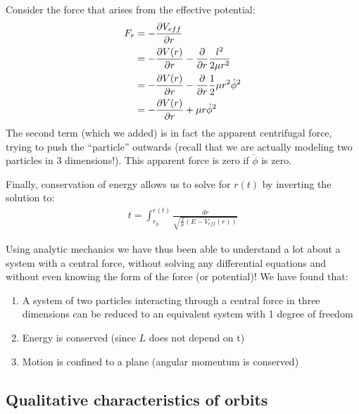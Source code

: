 Consider the force that arises from the effective potential:
\begin{align}
F_r&=-\frac{\partial V_{eff}}{\partial r}\nonumber\\
&=-\frac{\partial V(r)}{\partial r}-\frac{\partial }{\partial r}\frac{l^2}{2\mu r^2}\nonumber\\
&=-\frac{\partial V(r)}{\partial r}-\frac{\partial }{\partial r}\frac{1}{2}\mu r^2\dot\phi^2\nonumber\\
&=-\frac{\partial V(r)}{\partial r}+\mu r\dot\phi^2\nonumber\\
\end{align}
The second term (which we added) is in fact the apparent centrifugal force, trying to push the ``particle'' outwards (recall that we are actually modeling two particles in 3 dimensions!). This apparent force is zero if $\dot\phi$ is zero.

Finally, conservation of energy allows us to solve for $r(t)$ by inverting the solution to:
\begin{align}
t=\int_{r_0}^{r(t)}\frac{dr}{\sqrt{\frac{2}{\mu}(E-V_{eff}(r))}}
\end{align}

Using analytic mechanics we have thus been able to understand a lot about a system with a central force, without solving any differential equations and without even knowing the form of the force (or potential)! We have found that:
\begin{enumerate}
\item A system of two particles interacting through a central force in three dimensions can be reduced to an equivalent system with 1 degree of freedom
\item Energy is conserved (since $L$ does not depend on t)
\item Motion is confined to a plane (angular momentum is conserved)
\end{enumerate}

\subsection{Qualitative characteristics of orbits}

